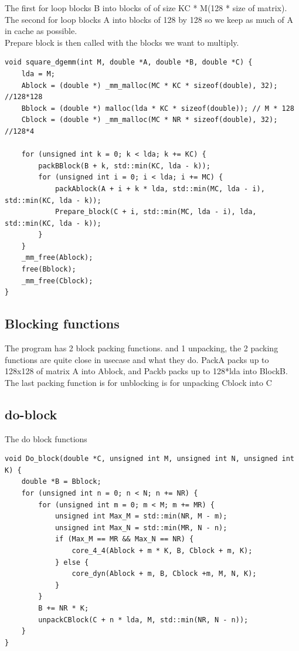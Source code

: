 \documentclass[a4paper,10pt,titlepage]{report}
\begin{document}
The first for loop blocks B into blocks of of size KC * M(128 * size of matrix). The second for loop blocks A into blocks of 128 by 128 so we keep as much of A in cache as possible. \\

Prepare block is then called with the blocks we want to multiply.

\begin{lstlisting} 
void square_dgemm(int M, double *A, double *B, double *C) {
    lda = M;
    Ablock = (double *) _mm_malloc(MC * KC * sizeof(double), 32); //128*128
    Bblock = (double *) malloc(lda * KC * sizeof(double)); // M * 128
    Cblock = (double *) _mm_malloc(MC * NR * sizeof(double), 32); //128*4

    for (unsigned int k = 0; k < lda; k += KC) {
        packBBlock(B + k, std::min(KC, lda - k));
        for (unsigned int i = 0; i < lda; i += MC) {
            packAblock(A + i + k * lda, std::min(MC, lda - i), std::min(KC, lda - k));
            Prepare_block(C + i, std::min(MC, lda - i), lda, std::min(KC, lda - k));
        }
    }
    _mm_free(Ablock);
    free(Bblock);
    _mm_free(Cblock);
}
\end{lstlisting}

\subsection{Blocking functions}
The program has 2 block packing functions. and 1 unpacking, the 2 packing functions are quite close in usecase and what they do. PackA packs up to 128x128 of matrix A into Ablock, and Packb packs up to 128*lda into BlockB.\\ \vspace{5mm}
The last packing function is for unblocking is for unpacking Cblock into C

\subsection{do-block}
The do block functions 
\begin{lstlisting}
void Do_block(double *C, unsigned int M, unsigned int N, unsigned int K) {
    double *B = Bblock;
    for (unsigned int n = 0; n < N; n += NR) {
        for (unsigned int m = 0; m < M; m += MR) {
            unsigned int Max_M = std::min(NR, M - m);
            unsigned int Max_N = std::min(MR, N - n);
            if (Max_M == MR && Max_N == NR) {
                core_4_4(Ablock + m * K, B, Cblock + m, K);
            } else {
                core_dyn(Ablock + m, B, Cblock +m, M, N, K);
            }
        }
        B += NR * K;
        unpackCBlock(C + n * lda, M, std::min(NR, N - n));
    }
}
\end{lstlisting}
\end{document}

